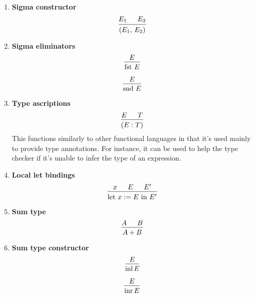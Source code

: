 \documentclass{article}
\begin{document}
\begin{enumerate}
  \item \textbf{Sigma constructor} \\
  \[
    \begin{prooftree}
      \hypo{E_1}
      \hypo{E_2}
      \infer2{(E_1, \, E_2)}
    \end{prooftree}  
  \]

  \item \textbf{Sigma eliminators} \\
  \[
    \begin{prooftree}
      \hypo{E}
      \infer1{\fst \, E}
    \end{prooftree}
  \]

  \[
   \begin{prooftree}
    \hypo{E}
    \infer1{\snd \, E}
   \end{prooftree}
 \]

\item \textbf{Type ascriptions} \\
  \[
    \begin{prooftree}
      \hypo{E}
      \hypo{T}
      \infer2{(E : T)}
    \end{prooftree}
  \]
  This functions similarly to other functional languages in that it's used
  mainly to provide type annotations. For instance, it can be used to help the
  type checker if it's unable to infer the type of an expression.

\item \textbf{Local let bindings} \\
\[
  \begin{prooftree}
    \hypo{x}
    \hypo{E}
    \hypo{E'}
    \infer3{\text{let } x := E \text{ in } E'}
  \end{prooftree}
\]

\item \textbf{Sum type} \\
\[
  \begin{prooftree}
    \hypo{A}
    \hypo{B}
    \infer2{A + B}
  \end{prooftree}
\]

\item \textbf{Sum type constructor} \\
\[
  \begin{prooftree}
    \hypo{E}
    \infer1{\inl E}
  \end{prooftree}
\]

\[
  \begin{prooftree}
    \hypo{E}
    \infer1{\inr E}
  \end{prooftree}
\]


\end{enumerate}
\end{document}
